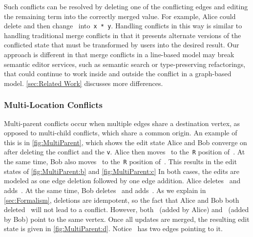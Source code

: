 Such conflicts can be resolved by deleting one of the conflicting edges
and editing the remaining term into the correctly merged value.
For example, Alice could delete \eMultiChildBob{} and then change~\vMultiChildAlice{} into~\texttt{x * y}.
Handling conflicts in this way is similar to handling traditional merge conflicts
in that it presents alternate versions of the conflicted state
that must be transformed by users into the desired result.
Our approach is different in that merge conflicts in a line-based model
may break semantic editor services, such as semantic search or type-preserving refactorings,
that could continue to work inside and outside the conflict in a graph-based model.
\autoref{sec:Related Work} discusses more differences.

\subsubsection{Multi-Location Conflicts}%
\label{sub:Multi-parent conflicts}

\figureMultiParent

Multi-parent conflicts occur when multiple edges share a destination vertex,
as opposed to multi-child conflicts, which share a common origin.
An example of this is in \autoref{fig:MultiParent},
which shows the edit state Alice and Bob converge on after deleting the conflict and the \texttt{v}.
Alice then moves~\vNestedPartsAlice{} to the~\texttt{R} position of~\vSimpleTimes{}.
At the same time, Bob also moves~\vNestedPartsAlice{} to the~\texttt{R} position of~\vWrapPlus{}.
This results in the edit states of \autoref{fig:MultiParent:b} and \autoref{fig:MultiParent:c}
In both cases, the edits are modeled as one edge deletion followed by one edge addition.
Alice deletes~\eNestedPartsAlice{} and adds~\eMultiParentAlice{}.
At the same time, Bob deletes~\eNestedPartsAlice{} and adds~\eMultiParentBob{}.
As we explain in \autoref{sec:Formalism}, deletions are idempotent,
so the fact that Alice and Bob both deleted~\eNestedPartsAlice{} will not lead to a conflict.
However, both~\eMultiParentAlice{} (added by Alice) and~\eMultiParentBob{} (added by Bob)
point to the same vertex.
Once all updates are merged, the resulting edit state is given in \autoref{fig:MultiParent:d}.
Notice~\vNestedPartsAlice{} has two edges pointing to it.

